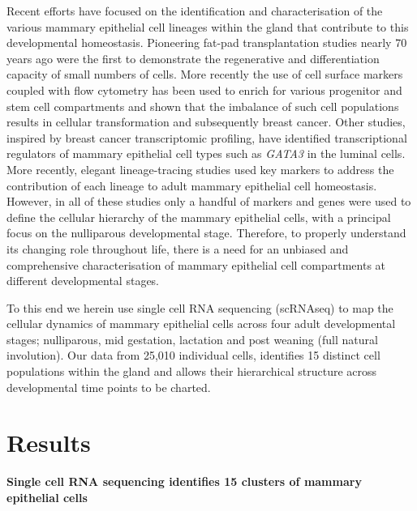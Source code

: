 \documentclass[titlepage, 12pt, oneside]{amsart}
\begin{document}
Recent efforts have focused on the identification and characterisation of the various mammary epithelial cell lineages within the gland that contribute to this developmental homeostasis.
Pioneering fat-pad transplantation studies nearly 70 years ago were the first to demonstrate the regenerative and differentiation capacity of small numbers of cells\autocite{Faulkin1960,Daniel197,Smalley1998}.
More recently the use of cell surface markers coupled with flow cytometry has been used to enrich for various progenitor and stem cell compartments\autocite{Smalley1998,Stingl2006,Shackleton2006,Asselin2007} and shown that the imbalance of such cell populations results in cellular transformation and subsequently breast cancer\autocite{Lim2009,Molyneux2010}.
Other studies, inspired by breast cancer transcriptomic profiling, have identified transcriptional regulators of mammary epithelial cell types such as \textit{GATA3} in the luminal cells\autocite{Asselin2007,Kouros2006}.
More recently, elegant lineage-tracing studies used key markers to address the contribution of each lineage to adult mammary epithelial cell homeostasis\autocite{Inman2015}.
However, in all of these studies only a handful of markers and genes were used to define the cellular hierarchy of the mammary epithelial cells, with a principal focus on the nulliparous developmental stage.
Therefore, to properly understand its changing role throughout life, there is a need for an unbiased and comprehensive characterisation of mammary epithelial cell compartments at different developmental stages.

To this end we herein use single cell RNA sequencing (scRNAseq) to map the cellular dynamics of mammary epithelial cells across four adult developmental stages; nulliparous, mid gestation, lactation and post weaning (full natural involution).
Our data from 25,010 individual cells, identifies 15 distinct cell populations within the gland and allows their hierarchical structure across developmental time points to be charted.

\section{Results}

\textbf{Single cell RNA sequencing identifies 15 clusters of mammary epithelial cells}
\end{document}

